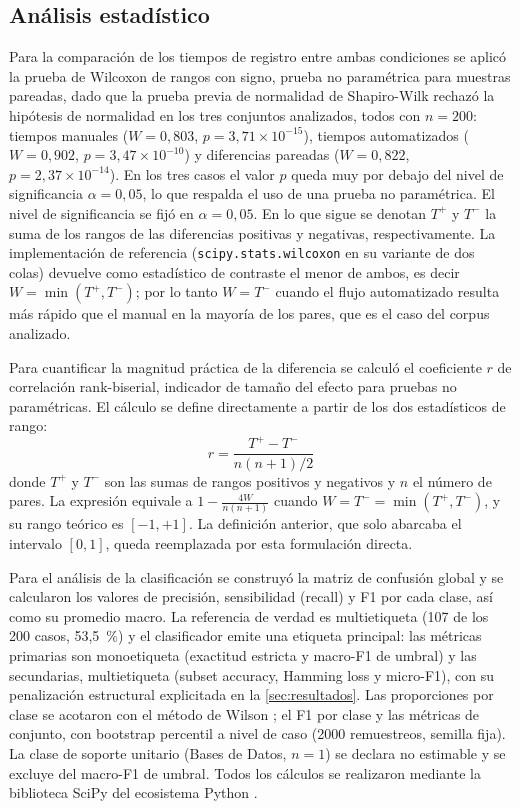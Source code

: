 \subsection{Análisis estadístico}\label{subsec:analisis-estadistico}

Para la comparación de los tiempos de registro entre ambas condiciones se aplicó la prueba de Wilcoxon de rangos con signo, prueba no paramétrica para muestras pareadas, dado que la prueba previa de normalidad de Shapiro-Wilk rechazó la hipótesis de normalidad en los tres conjuntos analizados, todos con \(n = 200\): tiempos manuales (\(W = 0{,}803\), \(p = 3{,}71 \times 10^{-15}\)), tiempos automatizados (\(W = 0{,}902\), \(p = 3{,}47 \times 10^{-10}\)) y diferencias pareadas (\(W = 0{,}822\), \(p = 2{,}37 \times 10^{-14}\)). En los tres casos el valor \(p\) queda muy por debajo del nivel de significancia \(\alpha = 0{,}05\), lo que respalda el uso de una prueba no paramétrica. El nivel de significancia se fijó en \(\alpha = 0{,}05\). En lo que sigue se denotan \(T^{+}\) y \(T^{-}\) la suma de los rangos de las diferencias positivas y negativas, respectivamente. La implementación de referencia (\texttt{scipy.stats.wilcoxon} en su variante de dos colas) devuelve como estadístico de contraste el menor de ambos, es decir \(W = \min(T^{+}, T^{-})\); por lo tanto \(W = T^{-}\) cuando el flujo automatizado resulta más rápido que el manual en la mayoría de los pares, que es el caso del corpus analizado.

Para cuantificar la magnitud práctica de la diferencia se calculó el coeficiente \(r\) de correlación rank-biserial, indicador de tamaño del efecto para pruebas no paramétricas. El cálculo se define directamente a partir de los dos estadísticos de rango:
\[
r = \frac{T^{+} - T^{-}}{n(n+1)/2}
\]
donde \(T^{+}\) y \(T^{-}\) son las sumas de rangos positivos y negativos y \(n\) el número de pares. La expresión equivale a \(1 - \frac{4W}{n(n+1)}\) cuando \(W = T^{-} = \min(T^{+}, T^{-})\), y su rango teórico es \([-1, +1]\). La definición anterior, que solo abarcaba el intervalo \([0, 1]\), queda reemplazada por esta formulación directa.

Para el análisis de la clasificación se construyó la matriz de confusión global y se calcularon los valores de precisión, sensibilidad (recall) y F1 por cada clase, así como su promedio macro. La referencia de verdad es multietiqueta (107 de los 200 casos, 53,5~\%) y el clasificador emite una etiqueta principal: las métricas primarias son monoetiqueta (exactitud estricta y macro-F1 de umbral) y las secundarias, multietiqueta (subset accuracy, Hamming loss y micro-F1), con su penalización estructural explicitada en la \autoref{sec:resultados}. Las proporciones por clase se acotaron con el método de Wilson \parencite{Wilson1927_probable_inference}; el F1 por clase y las métricas de conjunto, con bootstrap percentil a nivel de caso (2000 remuestreos, semilla fija). La clase de soporte unitario (Bases de Datos, \(n = 1\)) se declara no estimable y se excluye del macro-F1 de umbral. Todos los cálculos se realizaron mediante la biblioteca SciPy del ecosistema Python \parencite{Virtanen2020_scipy}.

